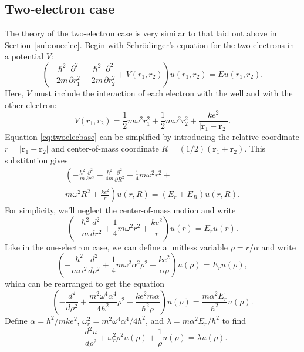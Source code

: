\documentclass[aps,prc,reprint,nobalancelastpage]{revtex4-1}
\begin{document}
    \subsection{Two-electron case}
    \label{sub:twoelec}
        The theory of the two-electron case is very similar to that laid out above in Section~\ref{sub:oneelec}. Begin with Schr\"odinger's equation for the two electrons in a potential $V$:
        \begin{equation}
            \left( -\frac{\hbar^2}{2m} \frac{\partial^2}{\partial r_1^2} - \frac{\hbar^2}{2m} \frac{\partial^2}{\partial r_2^2} + V(r_1, r_2) \right) u(r_1, r_2) = Eu(r_1, r_2).  \label{eq:twoelecbase}
        \end{equation}
        Here, $V$ must include the interaction of each electron with the well and with the other electron:
        \begin{equation*}
            V(r_1, r_2) = \frac{1}{2}m\omega^2 r_1^2 + \frac{1}{2}m\omega^2 r_2^2 + \frac{ke^2}{|\mathbf{r}_1 - \mathbf{r}_2|}.
        \end{equation*}
        Equation \ref{eq:twoelecbase} can be simplified by introducing the relative coordinate $r = |\mathbf{r}_1 - \mathbf{r}_2|$ and center-of-mass coordinate $R = (1/2)(\mathbf{r}_1 + \mathbf{r}_2)$. This substitution gives
        \begin{multline*}
            \left( -\frac{\hbar^2}{m}\frac{\partial^2}{\partial r^2} - \frac{\hbar^2}{4m}\frac{\partial^2}{\partial R^2} + \frac{1}{4}m\omega^2 r^2 +{} \right.\\\left. m\omega^2 R^2  + \frac{ke^2}{r} \right) u(r,R) = (E_r + E_R) u(r,R).
        \end{multline*}
        For simplicity, we'll neglect the center-of-mass motion and write
        \begin{equation*}
            \left( -\frac{\hbar^2}{m}\frac{d^2}{dr^2} + \frac{1}{4}m\omega^2 r^2 + \frac{ke^2}{r} \right) u(r) = E_r u(r).
        \end{equation*}
        Like in the one-electron case, we can define a unitless variable $\rho = r / \alpha$ and write
        \begin{equation*}
            \left( -\frac{\hbar^2}{m\alpha^2}\frac{d^2}{d\rho^2} + \frac{1}{4}m\omega^2\alpha^2 \rho^2 + \frac{ke^2}{\alpha\rho} \right) u(\rho) = E_r u(\rho),
        \end{equation*}
        which can be rearranged to get the equation
        \begin{equation*}
            \left( -\frac{d^2}{d\rho^2} + \frac{m^2\omega^4\alpha^4}{4\hbar^2} \rho^2 + \frac{ke^2m\alpha}{\hbar^2\rho} \right) u(\rho) = \frac{m\alpha^2E_r}{\hbar^2} u(\rho).
        \end{equation*}
        Define $\alpha = \hbar^2 / mke^2$, $\omega_r^2 = m^2\omega^4\alpha^4 / 4\hbar^2$, and $\lambda = m\alpha^2E_r / \hbar^2$ to find
        \begin{equation}
            -\frac{d^2 u}{d\rho^2} + \omega_r^2 \rho^2 u(\rho) + \frac{1}{\rho} u(\rho) = \lambda u(\rho). \label{eq:twoelecfinal}
        \end{equation}
\end{document}
